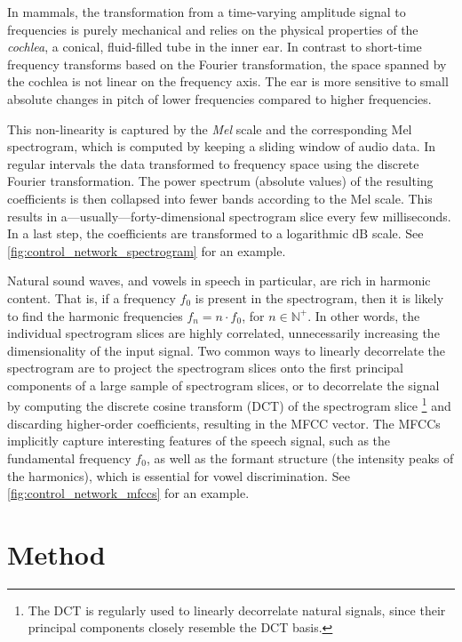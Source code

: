 \documentclass[letterpaper,10pt,conference]{ieeeconf}
\begin{document}
In mammals, the transformation from a time-varying amplitude signal to frequencies is purely mechanical and relies on the physical properties of the \emph{cochlea}, a conical, fluid-filled tube in the inner ear. In contrast to short-time frequency transforms based on the Fourier transformation, the space spanned by the cochlea is not linear on the frequency axis. The ear is more sensitive to small absolute changes in pitch of lower frequencies compared to higher frequencies.

This non-linearity is captured by the \emph{Mel} scale and the corresponding Mel spectrogram, which is computed by keeping a sliding window of audio data. In regular intervals the data transformed to frequency space using the discrete Fourier transformation. The power spectrum (absolute values) of the resulting coefficients is then collapsed into fewer bands according to the Mel scale. This results in a---usually---forty-dimensional spectrogram slice every few milliseconds. In a last step, the coefficients are transformed to a logarithmic $\mathrm{dB}$ scale. See \cref{fig:control_network_spectrogram} for an example.

Natural sound waves, and vowels in speech in particular, are rich in harmonic content. That is, if a frequency $f_0$ is present in the spectrogram, then it is likely to find the harmonic frequencies $f_n = n \cdot f_0$, for $n \in \mathbb{N}^+$. In other words, the individual spectrogram slices are highly correlated, unnecessarily increasing the dimensionality of the input signal. Two common ways to linearly decorrelate the spectrogram are to project the spectrogram slices onto the first principal components of a large sample of spectrogram slices, or to decorrelate the signal by computing the discrete cosine transform (DCT) of the spectrogram slice%
\footnote{The DCT is regularly used to linearly decorrelate natural signals, since their principal components closely resemble the DCT basis.} and discarding higher-order coefficients, resulting in the MFCC vector. The MFCCs implicitly capture interesting features of the speech signal, such as the fundamental frequency $f_0$, as well as the formant structure (the intensity peaks of the harmonics), which is essential for vowel discrimination. See \cref{fig:control_network_mfccs} for an example.

\section{Method}
\label{sec:method}
\end{document}
